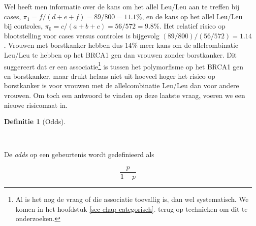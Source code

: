 \documentclass[
  dutch,
  letterpaper,
  12pt]{book}
\theoremstyle{definition}
\theoremstyle{definition}
\newtheorem{definition}{Definitie}[chapter]
\theoremstyle{definition}
\theoremstyle{remark}
\begin{document}
\begin{table}

\caption{\label{tbl-leu2}}


\end{table}%

Wel heeft men informatie over de kans om het allel Leu/Leu aan te
treffen bij cases, \(\pi_1=f/(d+e+f)=89/800=11.1\%\), en de kans op het
allel Leu/Leu bij controles, \(\pi_0=c/(a+b+c)=56/572=9.8\%\). Het
relatief risico op blootstelling voor cases versus controles is
bijgevolg \((89/800)/(56/572)=1.14\). Vrouwen met borstkanker hebben dus
14\% meer kans om de allelcombinatie Leu/Leu te hebben op het BRCA1 gen
dan vrouwen zonder borstkanker. Dit suggereert dat er een
associatie\footnote{Al is het nog de vraag of die associatie toevallig
  is, dan wel systematisch. We komen in het hoofdstuk
  \ref{sec-chap-categorisch}. terug op technieken om dit te onderzoeken.}
is tussen het polymorfisme op het BRCA1 gen en borstkanker, maar drukt
helaas niet uit hoeveel hoger het risico op borstkanker is voor vrouwen
met de allelcombinatie Leu/Leu dan voor andere vrouwen. Om toch een
antwoord te vinden op deze laatste vraag, voeren we een nieuwe
risicomaat in.

\begin{definition}[Odds]\protect\hypertarget{def-odds}{}\label{def-odds}

~

\end{definition}

De \emph{odds} op een gebeurtenis wordt gedefinieerd als

\begin{equation*}
\frac{p}{1-p}
\end{equation*}
\end{document}
